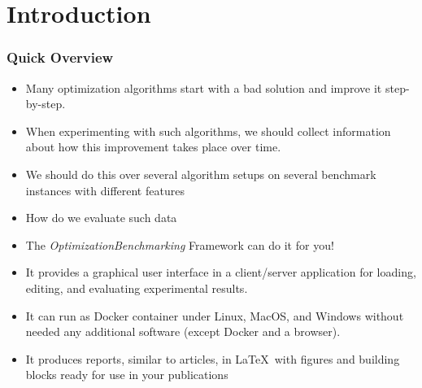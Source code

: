 %
\section{Introduction}%
%
\begin{frame}%
\frametitle{Quick Overview}%
\begin{itemize}%
\item Many optimization algorithms start with a bad solution and improve it step-by-step.%
\item<2-> When experimenting with such algorithms, we should collect information about how this improvement takes place over time.%
\item<3-> We should do this over several algorithm setups on several benchmark instances with different features%
\item<4-> \alert<-5>{How do we evaluate such data}%
\item<6-> The \emph{OptimizationBenchmarking} Framework can do it for you!%
\item<7-> It provides a graphical user interface in a client/server application for loading, editing, and evaluating experimental results.%
\item<8-> It can run as Docker container under Linux, MacOS, and Windows without needed any additional software (except Docker and a browser).%
\item<9-> It produces reports, similar to articles, in \LaTeX\ with figures and building blocks ready for use in your publications%
\end{itemize}%
\end{frame}%
%
%
%
